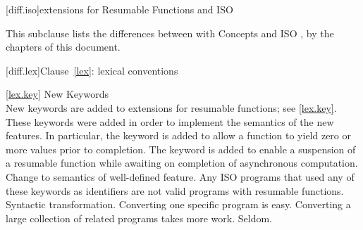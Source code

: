 
[diff.iso]{\Cpp extensions for Resumable Functions and ISO }

\pnum
This subclause lists the differences between \Cpp with Concepts
and ISO \Cpp, by the chapters of this document.

[diff.lex]{Clause~\ref{lex}: lexical conventions}

\ref{lex.key}
\change New Keywords\\
New keywords are added to \Cpp extensions for resumable functions;
see \ref{lex.key}.
\rationale
These keywords were added in order to implement the semantics of the
new features. In particular, the  keyword is added
to allow a function to yield zero or more values prior to completion. The  keyword is
added to enable a suspension of a resumable function while
awaiting on completion of asynchronous computation.
\effect
Change to semantics of well-defined feature.
Any ISO \Cpp programs that used any of these keywords as identifiers
are not valid \Cpp programs with resumable functions.
\difficulty
Syntactic transformation.
Converting one specific program is easy.
Converting a large collection
of related programs takes more work.
\howwide
Seldom.

